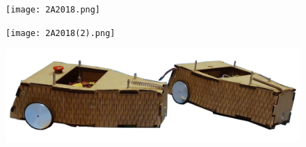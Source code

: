 \documentclass[a4paper,10pt]{article}
\begin{document}
\begin{spacing}{1.5}
\begin{multicols}{2}
  \begin{figure}[H]
    \center
    \texttt{[image: 2A2018.png]}
  \end{figure}
  \columnbreak
  \begin{figure}[H]
    \center
    \texttt{[image: 2A2018(2).png]}
  \end{figure}
\end{multicols}

  \begin{figure}[H]
    \center
    \includegraphics[scale=0.45]{brenda.png}
  \end{figure}


\end{spacing}
\end{document}
